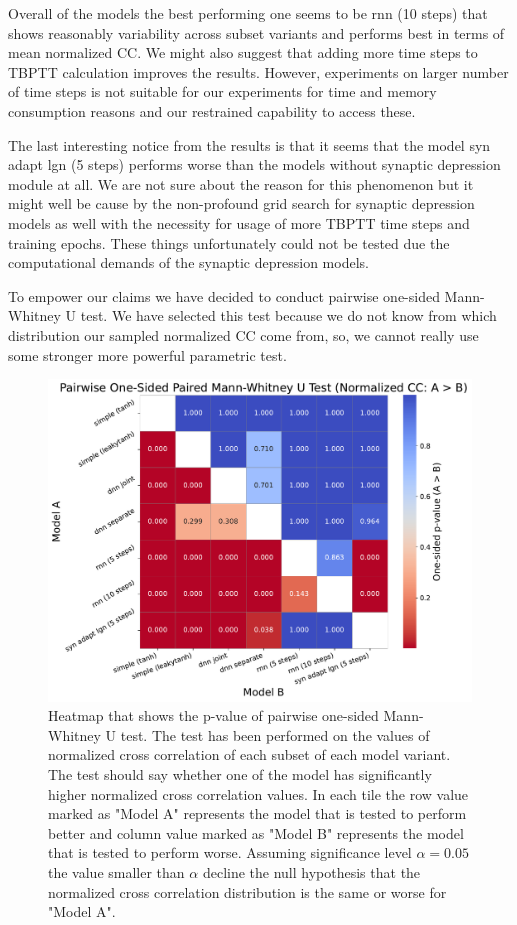 Overall of the models the best performing one seems to be rnn (10 steps) that shows reasonably variability across subset variants and performs best in terms of mean normalized CC. We might also suggest that adding more time steps to TBPTT calculation improves the results. However, experiments on larger number of time steps is not suitable for our experiments for time and memory consumption reasons and our restrained capability to access these.

The last interesting notice from the results is that it seems that the model syn adapt lgn (5 steps) performs worse than the models without synaptic depression module at all. We are not sure about the reason for this phenomenon but it might well be cause by the non-profound grid search for synaptic depression models as well with the necessity for usage of more TBPTT time steps and training epochs. These things unfortunately could not be tested due the computational demands of the synaptic depression models.

To empower our claims we have decided to conduct pairwise one-sided Mann-Whitney U test. We have selected this test because we do not know from which distribution our sampled normalized CC come from, so, we cannot really use some stronger more powerful parametric test.

\begin{figure}
    \centering
    \includegraphics[width=\linewidth]{img/plots/model_types_p_value_heatmap_cc_norm.pdf}
    \caption{Heatmap that shows the p-value of pairwise one-sided Mann-Whitney U test. The test has been performed on the values of normalized cross correlation of each subset of each model variant. The test should say whether one of the model has significantly higher normalized cross correlation values. In each tile the row value marked as "Model A" represents the model that is tested to perform better and column value marked as "Model B" represents the model that is tested to perform worse. Assuming significance level $\alpha=0.05$ the value smaller than $\alpha$ decline the null hypothesis that the normalized cross correlation distribution is the same or worse for "Model A".}
    \label{fig:model_types_p_values_heatmap}
\end{figure}